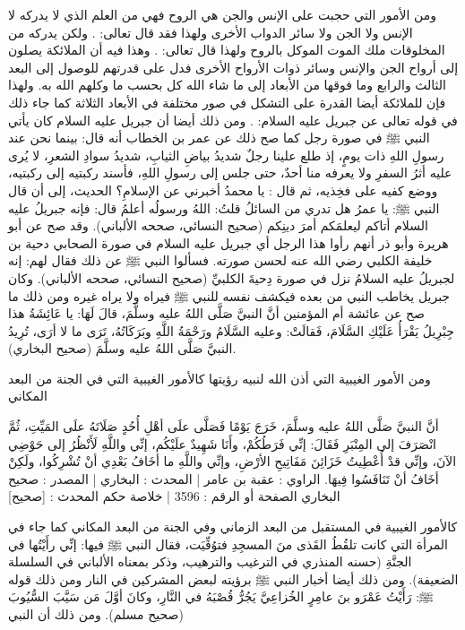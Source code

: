ومن الأمور التي حجبت على الإنس والجن هي الروح فهي من العلم الذي لا يدركه لا الإنس ولا الجن ولا سائر الدواب الأخرى ولهذا فقد قال تعالى: \quranayah*[17][85]{\footnotesize \surahname*[17]}. ولكن يدركه من المخلوقات ملك الموت الموكل بالروح ولهذا قال تعالى: \quranayah*[32][11]{\footnotesize \surahname*[32]}. وهذا فيه أن الملائكة يصلون إلى أرواح الجن والإنس وسائر ذوات الأرواح الأخرى فدل على قدرتهم للوصول إلى البعد الثالث والرابع وما فوقها من الأبعاد إلى ما شاء الله كل بحسب ما وكلهم الله به. ولهذا فإن للملائكة أيضا القدرة على التشكل في صور مختلفة في الأبعاد الثلاثة كما جاء ذلك في قوله تعالى عن جبريل عليه السلام: 
\quranayah*[19][17][5]{\footnotesize \surahname*[19]}. ومن ذلك أيضا أن جبريل عليه السلام كان يأتي النبي ﷺ في صورة رجل كما صح ذلك عن عمر بن الخطاب أنه قال: بينما نحن عند رسولِ اللهِ ذات يومٍ، إذ طلع علينا رجلٌ شديدُ بياضِ الثيابِ، شديدُ سوادِ الشعرِ، لا يُرى عليه أثرُ السفرِ ولا يعرفه منا أحدٌ، حتى جلس إلى رسولِ اللهِ، فأسند ركبتيه إلى ركبتيه، ووضع كفيه على فخِذيه، ثم قال : يا محمدُ أخبرني عن الإسلامِ؟ الحديث، إلى أن قال النبي ﷺ: يا عمرُ هل تدري من السائلُ قلتُ: اللهُ ورسولُه أعلمُ قال: فإنه جبريلُ عليه السلام أتاكم ليعلمَكم أمرَ دينِكم {\footnotesize (صحيح النسائي، صححه الألباني)}. وقد صح عن أبو هريرة وأبو ذر أنهم رأوا هذا الرجل أي جبريل عليه السلام في صورة الصحابي دحية بن خليفة الكلبي رضي الله عنه لحسن صورته. فسألوا النبي ﷺ عن ذلك فقال لهم: إنه لجبريلُ عليه السلامُ نزل في صورة دِحيةَ الكلبيِّ {\footnotesize (صحيح النسائي، صححه الألباني)}. وكان جبريل يخاطب النبي من بعده فيكشف نفسه للنبي ﷺ فيراه ولا يراه غيره ومن ذلك ما صح عن عائشة أم المؤمنين أنَّ النبيَّ صَلَّى اللهُ عليه وسلَّمَ، قالَ لَهَا: يا عَائِشَةُ هذا جِبْرِيلُ يَقْرَأُ عَلَيْكِ السَّلَامَ، فَقالَتْ: وعليه السَّلَامُ ورَحْمَةُ اللَّهِ وبَرَكَاتُهُ، تَرَى ما لا أرَى، تُرِيدُ النبيَّ صَلَّى اللهُ عليه وسلَّمَ {\footnotesize (صحيح البخاري)}.

ومن الأمور الغيبية التي أذن الله لنبيه رؤيتها كالأمور الغيبية التي في الجنة من البعد المكاني 

أنَّ النبيَّ صَلَّى اللهُ عليه وسلَّمَ، خَرَجَ يَوْمًا فَصَلَّى علَى أهْلِ أُحُدٍ صَلَاتَهُ علَى المَيِّتِ، ثُمَّ انْصَرَفَ إلى المِنْبَرِ فَقَالَ: إنِّي فَرَطُكُمْ، وأَنَا شَهِيدٌ علَيْكُم، إنِّي واللَّهِ لَأَنْظُرُ إلى حَوْضِي الآنَ، وإنِّي قدْ أُعْطِيتُ خَزَائِنَ مَفَاتِيحِ الأرْضِ، وإنِّي واللَّهِ ما أخَافُ بَعْدِي أنْ تُشْرِكُوا، ولَكِنْ أخَافُ أنْ تَنَافَسُوا فِيهَا.
الراوي : عقبة بن عامر | المحدث : البخاري | المصدر : صحيح البخاري
الصفحة أو الرقم : 3596 | خلاصة حكم المحدث : [صحيح] 


كالأمور الغيبية في المستقبل من البعد الزماني وفي الجنة من البعد المكاني كما جاء في المرأة التي كانت تلقُطُ القَذى منَ المسجِدِ فتوُفِّيَت، فقال النبي ﷺ فيها: إنِّي رأَيْتُها في الجنَّةِ {\footnotesize (حسنه المنذري في الترغيب والترهيب، وذكر بمعناه الألباني في السلسلة الضعيفة)}. ومن ذلك أيضا أخبار النبي ﷺ برؤيته لبعض المشركين في النار ومن ذلك قوله ﷺ: رَأَيْتُ عَمْرَو بنَ عامِرٍ الخُزاعِيَّ يَجُرُّ قُصْبَهُ في النَّارِ، وكانَ أوَّلَ مَن سَيَّبَ السُّيُوبَ {\footnotesize (صحيح مسلم)}. 
ومن ذلك أن النبي 



